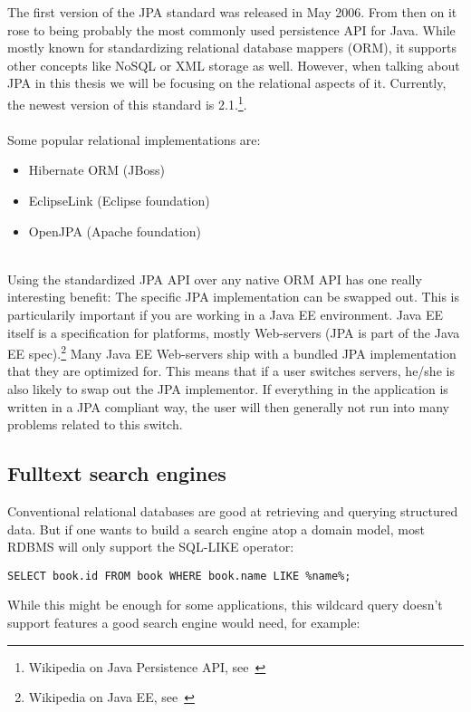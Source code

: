 The first version of the JPA standard was released in May 2006. From then on it rose to being probably the most commonly used persistence API for Java. While mostly known for standardizing relational database mappers (ORM), it supports other concepts like NoSQL or XML storage as well. However, when talking about JPA in this thesis we will be focusing on the relational aspects of it. Currently, the newest version of this standard is 2.1.\footnote{Wikipedia on Java Persistence API, see~\cite{wiki_jpa}}.
\\\\
Some popular relational implementations are:
\begin{itemize}
	\item Hibernate ORM (JBoss)
	\item EclipseLink (Eclipse foundation)
	\item OpenJPA (Apache foundation)
\end{itemize}
~\\
Using the standardized JPA API over any native ORM API has one really interesting benefit:
The specific JPA implementation can be swapped out. This is particularily important if you are working in a Java EE environment. Java EE itself is a specification for platforms, mostly Web-servers (JPA is part of the Java EE spec).\footnote{Wikipedia on Java EE, see~\cite{wiki_java_ee}} Many Java EE Web-servers ship with a bundled JPA implementation that they are optimized for. This means that if a user switches servers, he/she is also likely to swap out the JPA implementor. If everything in the application is written in a JPA compliant way, the user will then generally not run into many problems related to this switch.

\subsection{Fulltext search engines}

Conventional relational databases are good at retrieving and querying structured data. But if one wants to build a search engine atop a domain model, most RDBMS will only support the SQL-LIKE operator:\\

\lstset{language=sql}
\begin{lstlisting}[frame=htrbl, label={lst:result2}]
SELECT book.id FROM book WHERE book.name LIKE %name%;
\end{lstlisting}
While this might be enough for some applications, this wildcard query doesn't support features a good search engine would need, for example:

